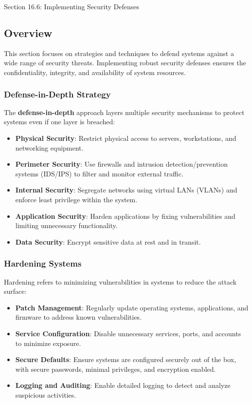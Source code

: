 \begin{notes}{Section 16.6: Implementing Security Defenses}
    \subsection*{Overview}

    This section focuses on strategies and techniques to defend systems against a wide range of security threats. Implementing robust security defenses ensures the confidentiality, integrity, and 
    availability of system resources.
    
    \subsubsection*{Defense-in-Depth Strategy}
    
    The \textbf{defense-in-depth} approach layers multiple security mechanisms to protect systems even if one layer is breached:
    \begin{itemize}
        \item \textbf{Physical Security}: Restrict physical access to servers, workstations, and networking equipment.
        \item \textbf{Perimeter Security}: Use firewalls and intrusion detection/prevention systems (IDS/IPS) to filter and monitor external traffic.
        \item \textbf{Internal Security}: Segregate networks using virtual LANs (VLANs) and enforce least privilege within the system.
        \item \textbf{Application Security}: Harden applications by fixing vulnerabilities and limiting unnecessary functionality.
        \item \textbf{Data Security}: Encrypt sensitive data at rest and in transit.
    \end{itemize}
    
    \subsubsection*{Hardening Systems}
    
    Hardening refers to minimizing vulnerabilities in systems to reduce the attack surface:
    \begin{itemize}
        \item \textbf{Patch Management}: Regularly update operating systems, applications, and firmware to address known vulnerabilities.
        \item \textbf{Service Configuration}: Disable unnecessary services, ports, and accounts to minimize exposure.
        \item \textbf{Secure Defaults}: Ensure systems are configured securely out of the box, with secure passwords, minimal privileges, and encryption enabled.
        \item \textbf{Logging and Auditing}: Enable detailed logging to detect and analyze suspicious activities.
    \end{itemize}
    

\end{notes}

